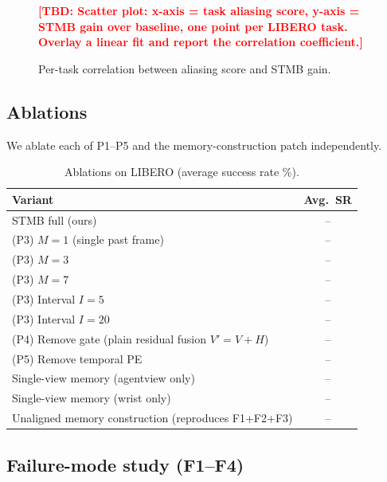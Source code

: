 \documentclass[11pt]{article}
\newcommand{\todo}[1]{\textcolor{red}{\textbf{[TBD: #1]}}}
\newcommand{\num}{--} %
\begin{document}
\begin{figure}[h]
\centering
\todo{Scatter plot: x-axis = task aliasing score, y-axis = STMB gain over
baseline, one point per LIBERO task. Overlay a linear fit and report the
correlation coefficient.}
\caption{Per-task correlation between aliasing score and STMB gain.}
\label{fig:alias-scatter}
\end{figure}

\subsection{Ablations}
\label{sec:exp-ablation}

We ablate each of P1--P5 and the memory-construction patch independently.

\begin{table}[h]
\centering
\caption{Ablations on LIBERO (average success rate \%).}
\label{tab:ablations}
\small
\begin{tabular}{lc}
\toprule
Variant & Avg.~SR \\
\midrule
STMB full (ours)                                                 & \num \\
(P3) $M{=}1$ (single past frame)                                  & \num \\
(P3) $M{=}3$                                                      & \num \\
(P3) $M{=}7$                                                      & \num \\
(P3) Interval $I{=}5$                                              & \num \\
(P3) Interval $I{=}20$                                             & \num \\
(P4) Remove gate (plain residual fusion $V' = V + H$)             & \num \\
(P5) Remove temporal PE                                           & \num \\
Single-view memory (agentview only)                               & \num \\
Single-view memory (wrist only)                                   & \num \\
Unaligned memory construction (reproduces F1+F2+F3)               & \num \\
\bottomrule
\end{tabular}
\end{table}

\subsection{Failure-mode study (F1--F4)}
\end{document}
